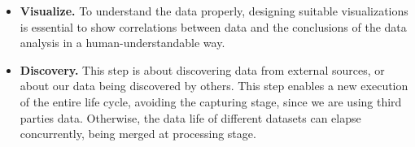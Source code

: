 \begin{itemize}
    \item \textbf{Visualize.} To understand the data properly, designing suitable visualizations is essential to show correlations between data and the conclusions of the data analysis in a human-understandable way.
    \item \textbf{Discovery.} This step is about discovering data from external sources, or about our data being discovered by others. This step enables a new execution of the entire life cycle, avoiding the capturing stage, since we are using third parties data. Otherwise, the data life of different datasets can elapse concurrently, being merged at processing stage.
\end{itemize}

